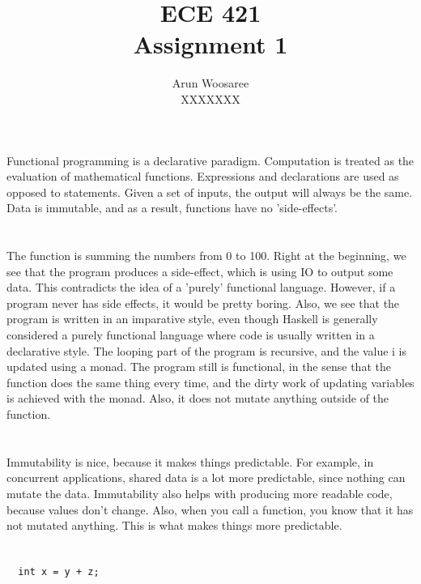 \documentclass[letterpaper]{article}
\title{ECE 421 \\
Assignment 1}
\author{Arun Woosaree\\
XXXXXXX
}
\begin{document}
\maketitle %

\section{}
Functional programming is a declarative paradigm.
Computation is treated as the evaluation of mathematical functions.
Expressions and declarations are used as opposed to statements.
Given a set of inputs, the output will always be the same.
Data is immutable, and as a result,
functions have no 'side-effects'.

\section{}
The function is summing the numbers from 0 to 100.
Right at the beginning, we see that the program produces a side-effect, which
is using IO to output some data. This contradicts the idea of a 'purely'
functional language. However, if a program never has side effects, it would be
pretty boring.
Also, 
we see that the program is written in an imparative style, even though Haskell
is generally considered a purely functional language where code is usually
written in a declarative style. The looping part of the program is recursive,
and the value i is updated using a monad. The program still is functional,
in the sense that the function does the same thing every time, and the dirty
work of updating variables is achieved with the monad. Also, it does not mutate
anything outside of the function.


\section{}
Immutability is nice, because it makes things predictable.
For example, in concurrent applications, shared data is a lot more predictable,
since nothing can mutate the data. 
Immutability also helps with producing more readable code, because values don't
change. Also, when you call a function, you know that it has not mutated
anything. This is what makes things more predictable.

\section{}
\subsection{}
\begin{verbatim}
  int x = y + z;
\end{verbatim}
\end{document}
